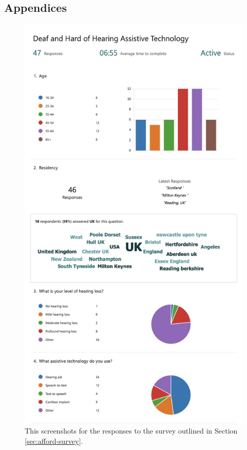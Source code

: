 \documentclass{l4proj}
\begin{document}
%
% 

\begin{appendices}

\chapter{Appendices}
\label{sec:apendix}

\begin{figure}[H]
    \centering
    \includegraphics[width=0.75\linewidth]{dissertation/images/afford-survey-1.jpeg}    
    \caption{This screenshots for the responses to the survey outlined in Section \ref{sec:afford-survey}.}
    \label{fig:afford-survey-1} 
\end{figure}


\end{appendices}
\end{document}
